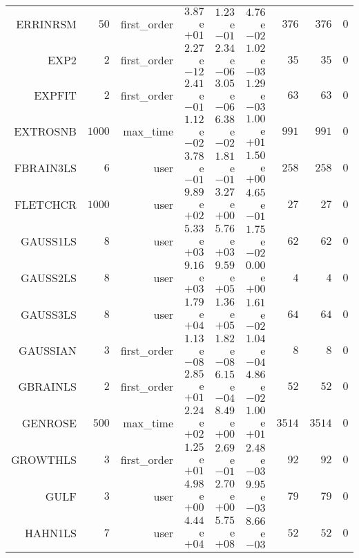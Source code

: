 \begin{longtable}{rrrrrrrrr}
ERRINRSM & \(    50\) & first\_order & \( 3.87\)e\(+01\) & \( 1.23\)e\(-01\) & \( 4.76\)e\(-02\) & \(   376\) & \(   376\) & \(     0\) \\
EXP2 & \(     2\) & first\_order & \( 2.27\)e\(-12\) & \( 2.34\)e\(-06\) & \( 1.02\)e\(-03\) & \(    35\) & \(    35\) & \(     0\) \\
EXPFIT & \(     2\) & first\_order & \( 2.41\)e\(-01\) & \( 3.05\)e\(-06\) & \( 1.29\)e\(-03\) & \(    63\) & \(    63\) & \(     0\) \\
EXTROSNB & \(  1000\) & max\_time & \( 1.12\)e\(-02\) & \( 6.38\)e\(-02\) & \( 1.00\)e\(+01\) & \(   991\) & \(   991\) & \(     0\) \\
FBRAIN3LS & \(     6\) & user & \( 3.78\)e\(-01\) & \( 1.81\)e\(-01\) & \( 1.50\)e\(+00\) & \(   258\) & \(   258\) & \(     0\) \\
FLETCHCR & \(  1000\) & user & \( 9.89\)e\(+02\) & \( 3.27\)e\(+00\) & \( 4.65\)e\(-01\) & \(    27\) & \(    27\) & \(     0\) \\
GAUSS1LS & \(     8\) & user & \( 5.33\)e\(+03\) & \( 5.76\)e\(+03\) & \( 1.75\)e\(-02\) & \(    62\) & \(    62\) & \(     0\) \\
GAUSS2LS & \(     8\) & user & \( 9.16\)e\(+03\) & \( 9.59\)e\(+05\) & \( 0.00\)e\(+00\) & \(     4\) & \(     4\) & \(     0\) \\
GAUSS3LS & \(     8\) & user & \( 1.79\)e\(+04\) & \( 1.36\)e\(+05\) & \( 1.61\)e\(-02\) & \(    64\) & \(    64\) & \(     0\) \\
GAUSSIAN & \(     3\) & first\_order & \( 1.13\)e\(-08\) & \( 1.82\)e\(-08\) & \( 1.04\)e\(-04\) & \(     8\) & \(     8\) & \(     0\) \\
GBRAINLS & \(     2\) & first\_order & \( 2.85\)e\(+01\) & \( 6.15\)e\(-04\) & \( 4.86\)e\(-02\) & \(    52\) & \(    52\) & \(     0\) \\
GENROSE & \(   500\) & max\_time & \( 2.24\)e\(+02\) & \( 8.49\)e\(+00\) & \( 1.00\)e\(+01\) & \(  3514\) & \(  3514\) & \(     0\) \\
GROWTHLS & \(     3\) & first\_order & \( 1.25\)e\(+01\) & \( 2.69\)e\(-01\) & \( 2.48\)e\(-03\) & \(    92\) & \(    92\) & \(     0\) \\
GULF & \(     3\) & user & \( 4.98\)e\(+00\) & \( 2.70\)e\(+00\) & \( 9.95\)e\(-03\) & \(    79\) & \(    79\) & \(     0\) \\
HAHN1LS & \(     7\) & user & \( 4.44\)e\(+04\) & \( 5.75\)e\(+08\) & \( 8.66\)e\(-03\) & \(    52\) & \(    52\) & \(     0\) \\

\end{longtable}
